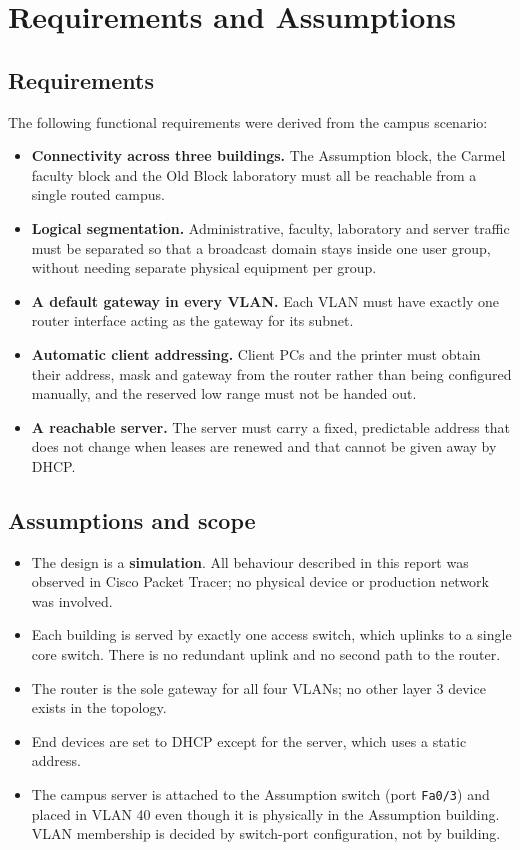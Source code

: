 \documentclass[11pt,a4paper]{article}
\begin{document}
\section{Requirements and Assumptions}

\subsection{Requirements}

The following functional requirements were derived from the campus scenario:

\begin{itemize}
  \item \textbf{Connectivity across three buildings.} The Assumption block, the Carmel
        faculty block and the Old Block laboratory must all be reachable from a single
        routed campus.
  \item \textbf{Logical segmentation.} Administrative, faculty, laboratory and server
        traffic must be separated so that a broadcast domain stays inside one user
        group, without needing separate physical equipment per group.
  \item \textbf{A default gateway in every VLAN.} Each VLAN must have exactly one
        router interface acting as the gateway for its subnet.
  \item \textbf{Automatic client addressing.} Client PCs and the printer must obtain
        their address, mask and gateway from the router rather than being configured
        manually, and the reserved low range must not be handed out.
  \item \textbf{A reachable server.} The server must carry a fixed, predictable address
        that does not change when leases are renewed and that cannot be given away by
        DHCP.
\end{itemize}

\subsection{Assumptions and scope}

\begin{itemize}
  \item The design is a \textbf{simulation}. All behaviour described in this report was
        observed in Cisco Packet Tracer; no physical device or production network was
        involved.
  \item Each building is served by exactly one access switch, which uplinks to a single
        core switch. There is no redundant uplink and no second path to the router.
  \item The router is the sole gateway for all four VLANs; no other layer 3 device
        exists in the topology.
  \item End devices are set to DHCP except for the server, which uses a static address.
  \item The campus server is attached to the Assumption switch (port \texttt{Fa0/3}) and
        placed in VLAN 40 even though it is physically in the Assumption building. VLAN
        membership is decided by switch-port configuration, not by building.
\end{itemize}
\end{document}
